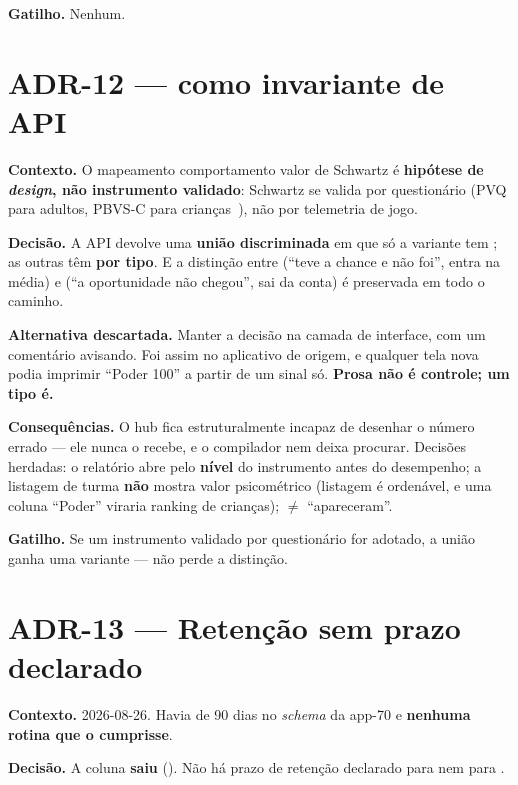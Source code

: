 \textbf{Gatilho.} Nenhum.

\section{ADR-12 ---  como invariante de API}

\textbf{Contexto.} O mapeamento comportamento \seta{} valor de Schwartz é
\textbf{hipótese de \emph{design}, não instrumento validado}: Schwartz se valida
por questionário (PVQ para adultos, PBVS-C para
crianças~\cite{schwartz2012overview,doring2010pbvsc}), não por telemetria de jogo.

\textbf{Decisão.} A API devolve uma \textbf{união discriminada} em que só a
variante  tem ; as outras têm 
\textbf{por tipo}. E a distinção entre  (\enquote{teve a chance e não
foi}, entra na média) e  (\enquote{a oportunidade não chegou}, sai da
conta) é preservada em todo o caminho.

\textbf{Alternativa descartada.} Manter a decisão na camada de interface, com um
comentário avisando. Foi assim no aplicativo de origem, e qualquer tela nova podia
imprimir \enquote{Poder 100} a partir de um sinal só. \textbf{Prosa não é
controle; um tipo é.}

\textbf{Consequências.} O hub fica estruturalmente incapaz de desenhar o número
errado --- ele nunca o recebe, e o compilador nem deixa procurar. Decisões
herdadas: o relatório abre pelo \textbf{nível} do instrumento antes do desempenho;
a listagem de turma \textbf{não} mostra valor psicométrico (listagem é ordenável,
e uma coluna \enquote{Poder} viraria ranking de crianças);
 $\neq$ \enquote{apareceram}.

\textbf{Gatilho.} Se um instrumento validado por questionário for adotado, a
união ganha uma variante --- não perde a distinção.

\section{ADR-13 --- Retenção sem prazo declarado}

\textbf{Contexto.} 2026-08-26. Havia  de 90 dias no \emph{schema}
da app-70 e \textbf{nenhuma rotina que o cumprisse}.

\textbf{Decisão.} A coluna \textbf{saiu}
(). Não há prazo de retenção declarado para
 nem para .

